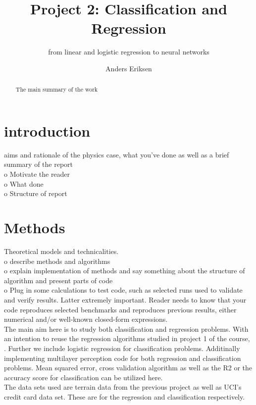 \documentclass[12pt, a4paper]{scrartcl}
\title{Project 2: Classification and Regression}%
\subtitle{from linear and logistic regression to neural networks}
\author{Anders Eriksen}
\date{}
\begin{document}
\maketitle
\tableofcontents
\begin{abstract}
    The main summary of the work
\end{abstract}

\section{introduction}
    aims and rationale of the physics case, what you've done as well as a brief summary of 
the report \\
    o   Motivate the reader\\
    o   What done\\
    o   Structure of report\\
\section{Methods}
    Theoretical models and technicalities. \\
    o   describe methods and algorithms\\
    o   explain implementation of methods and say something about the structure of
        algorithm and present parts of code\\
    o   Plug in some calculations to test code, such as selected runs used to validate and
        verify results. Latter extremely important. Reader needs to know that your code
        reproduces selected benchmarks and reproduces previous results, either numerical 
        and/or well-known closed-form expressions. \\

   The main aim here is to study both classification and regression problems. With an intention to 
reuse the regression algorithms studied in project 1 of the course, \cite{project1}. Further we include logistic regression
for classification problems. Additinally implementing multilayer perception code for both regression and 
classification problems. Mean squared error, cross validation algorithm as well as the R2 or the accuracy 
score for classification can be utilized here. \\

    The data sets used are terrain data from the previous project as well as UCI's credit card data set. These 
are for the regression and classification respectively. %
\\
\end{document}
